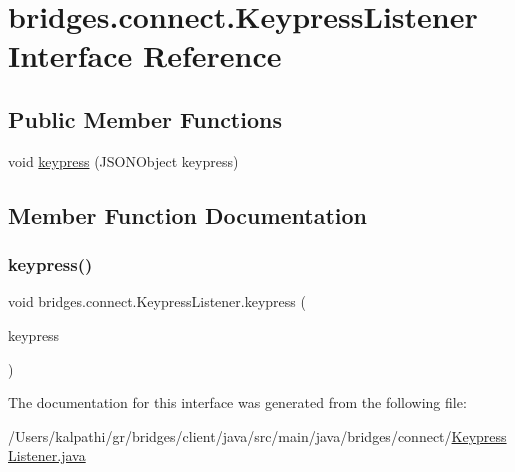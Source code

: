 \hypertarget{interfacebridges_1_1connect_1_1_keypress_listener}{}\section{bridges.\+connect.\+Keypress\+Listener Interface Reference}
\label{interfacebridges_1_1connect_1_1_keypress_listener}
\subsection*{Public Member Functions}
\begin{DoxyCompactItemize}
\item 
void \mbox{\hyperlink{interfacebridges_1_1connect_1_1_keypress_listener_af713d94f36bce842f39ce0aea4db8da6}{keypress}} (J\+S\+O\+N\+Object keypress)
\end{DoxyCompactItemize}


\subsection{Member Function Documentation}
\mbox{\label{interfacebridges_1_1connect_1_1_keypress_listener_af713d94f36bce842f39ce0aea4db8da6}} 
\subsubsection{\texorpdfstring{keypress()}{keypress()}}
{\footnotesize\ttfamily void bridges.\+connect.\+Keypress\+Listener.\+keypress (\begin{DoxyParamCaption}\item[{J\+S\+O\+N\+Object}]{keypress }\end{DoxyParamCaption})}



The documentation for this interface was generated from the following file\+:\begin{DoxyCompactItemize}
\item 
/\+Users/kalpathi/gr/bridges/client/java/src/main/java/bridges/connect/\mbox{\hyperlink{_keypress_listener_8java}{Keypress\+Listener.\+java}}\end{DoxyCompactItemize}
